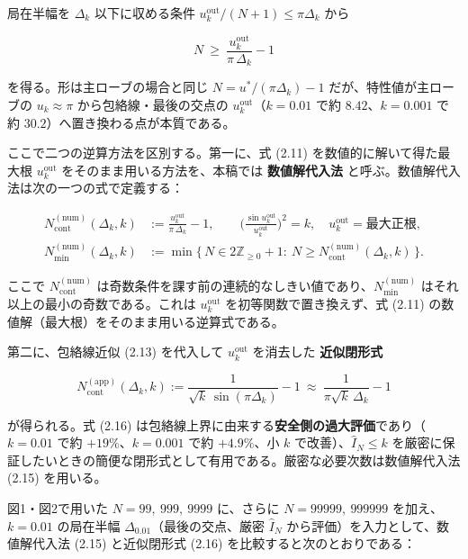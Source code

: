 \documentclass[
]{ltjsarticle}
\begin{document}
局在半幅を \(\Delta_k\) 以下に収める条件
\(u_k^{\mathrm{out}}/(N+1)\le \pi\Delta_k\) から

\[
N\ \ge\ \frac{u_k^{\mathrm{out}}}{\pi\,\Delta_k}-1
\tag{2.14}
\]

を得る。形は主ローブの場合と同じ \(N=u^{\ast}/(\pi\Delta_k)-1\)
だが、特性値が主ローブの \(u_k\approx\pi\) から包絡線・最後の交点の
\(u_k^{\mathrm{out}}\)（\(k=0.01\) で約 \(8.42\)、\(k=0.001\) で約
\(30.2\)）へ置き換わる点が本質である。

ここで二つの逆算方法を区別する。第一に、式 (2.11)
を数値的に解いて得た最大根 \(u_k^{\mathrm{out}}\)
をそのまま用いる方法を、本稿では \textbf{数値解代入法}
と呼ぶ。数値解代入法は次の一つの式で定義する：

\[
\begin{aligned}
N_{\mathrm{cont}}^{(\mathrm{num})}(\Delta_k,k)
&:=\frac{u_k^{\mathrm{out}}}{\pi\,\Delta_k}-1,
\qquad
\Big(\frac{\sin u_k^{\mathrm{out}}}{u_k^{\mathrm{out}}}\Big)^2=k,\quad u_k^{\mathrm{out}}=\text{最大正根},\\
N_{\min}^{(\mathrm{num})}(\Delta_k,k)
&:=\min\Big\{\,N\in 2\mathbb{Z}_{\ge 0}+1:\ N\ge N_{\mathrm{cont}}^{(\mathrm{num})}(\Delta_k,k)\,\Big\}.
\end{aligned}
\tag{2.15}
\]

ここで \(N_{\mathrm{cont}}^{(\mathrm{num})}\)
は奇数条件を課す前の連続的なしきい値であり、\(N_{\min}^{(\mathrm{num})}\)
はそれ以上の最小の奇数である。これは \(u_k^{\mathrm{out}}\)
を初等関数で置き換えず、式 (2.11)
の数値解（最大根）をそのまま用いる逆算式である。

第二に、包絡線近似 (2.13) を代入して \(u_k^{\mathrm{out}}\) を消去した
\textbf{近似閉形式}

\[
N_{\mathrm{cont}}^{(\mathrm{app})}(\Delta_k,k)
:=\frac{1}{\sqrt{k}\,\sin(\pi\Delta_k)}-1
\ \approx\ \frac{1}{\pi\sqrt{k}\,\Delta_k}-1
\tag{2.16}
\]

が得られる。式 (2.16)
は包絡線上界に由来する\textbf{安全側の過大評価}であり（\(k=0.01\) で約
\(+19\%\)、\(k=0.001\) で約 \(+4.9\%\)、小 \(k\)
で改善）、\(\widehat{I}_N\le k\)
を厳密に保証したいときの簡便な閉形式として有用である。厳密な必要次数は数値解代入法
(2.15) を用いる。

図1・図2で用いた \(N=99,\ 999,\ 9999\) に、さらに \(N=99999,\ 999999\)
を加え、\(k=0.01\) の局在半幅 \(\Delta_{0.01}\)（最後の交点、厳密
\(\widehat{I}_N\) から評価）を入力として、数値解代入法 (2.15)
と近似閉形式 (2.16) を比較すると次のとおりである：
\end{document}
